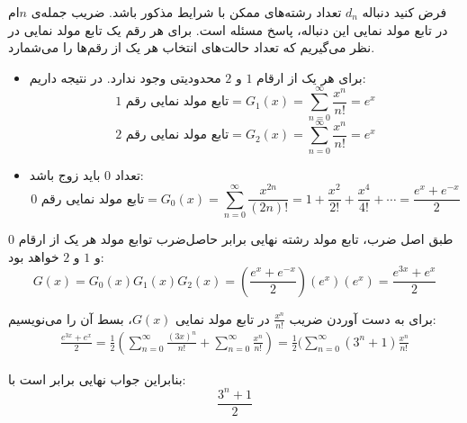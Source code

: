 \p
فرض کنید دنباله 
$d_n$ 
 تعداد رشته‌های ممکن با شرایط مذکور
باشد.
ضریب 
‌جمله‌ی 
$n$ام
در تابع مولد نمایی 
 این دنباله،
 پاسخ مسئله است.
برای هر رقم یک تابع مولد نمایی در نظر می‌گیریم که تعداد حالت‌های انتخاب‌ هر یک از رقم‌ها را می‌شمارد.
\begin{itemize}
\item
برای هر یک از ارقام
$1$
و 
$2$
 محدودیتی وجود ندارد. در نتیجه داریم:
$$\text{تابع مولد نمایی رقم 1} = G_1(x) = \sum\limits_{n=0}^{\infty}\frac{x^n}{n!} = e^x$$
$$\text{تابع مولد نمایی رقم 2} = G_2(x) = \sum\limits_{n=0}^{\infty}\frac{x^n}{n!} = e^x$$
\item
تعداد  
$0$
باید زوج باشد:
$$\text{تابع مولد نمایی رقم 0} = G_0(x) = \sum\limits_{n=0}^{\infty}\frac{x^{2n}}{(2n)!} = 1 + \frac{x^2}{2!} + \frac{x^4}{4!} + \cdots = \frac{e^x + e^{-x}}{2}$$
\end{itemize}
طبق اصل ضرب،
تابع مولد رشته نهایی برابر
 حاصل‌ضرب توابع مولد هر یک از ارقام 
 $0$
و
$1$
و 
$2$
 خواهد بود:
$$G(x) = G_0(x)G_1(x)G_2(x) = (\frac{e^x + e^{-x}}{2})(e^x)(e^{x}) = \frac{e^{3x} + e^x}{2}$$

برای به دست آوردن ضریب
$\frac{x^n}{n!}$
 در تابع مولد نمایی
 $G(x)$،
  بسط آن را می‌نویسیم: 
  \begin{align*}
    \frac{e^{3x} + e^x}{2} = \frac{1}{2}(\sum\limits_{n=0}^{\infty}\frac{(3x)^n}{n!} + \sum\limits_{n=0}^{\infty}\frac{x^n}{n!}) =\frac{1}{2}(\sum\limits_{n=0}^{\infty}(3^n + 1)\frac{x^n}{n!}
  \end{align*}

بنابراین جواب نهایی برابر است با:
$$\frac{3^n+1}{2}$$

